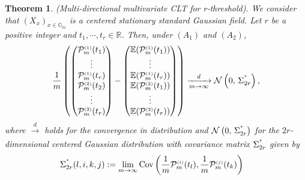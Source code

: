 \documentclass[12pt]{article}
\theoremstyle{Theorem}
\newtheorem{Theorem}{Theorem}[section]
\theoremstyle{definition}
\begin{document}
\begin{Theorem}\label{TCL}(Multi-directional multivariate CLT for r-threshold). We consider that $(X_{x})_{x\in \mathbb{G}_{m}}$ is a centered stationary standard Gaussian field. Let $r$ be a positive integer and $t_{1}, \cdots,t_{r} \in \mathbb{R}$. Then, under \textbf{$(A_{1})$} and \textbf{$(A_{2})$},
\begin{equation*}
\frac{1}{m}\left(\begin{pmatrix} \mathcal{P}^{\scriptscriptstyle (1)}_{m}(t_{1}) \\  \vdots \\ \mathcal{P}^{\scriptscriptstyle (1)}_{m}(t_{r}) \\ \mathcal{P}^{\scriptscriptstyle (2)}_{m}(t_{2}) \\  \vdots \\ \mathcal{P}^{\scriptscriptstyle (2)}_{m}(t_{r})  \end{pmatrix} - \begin{pmatrix} \mathbb{E}(\mathcal{P}^{\scriptscriptstyle (1)}_{m}(t_{1}))  \\ \vdots \\ \mathbb{E}(\mathcal{P}^{\scriptscriptstyle (1)}_{m}(t_{r}))\\\mathbb{E}(\mathcal{P}^{\scriptscriptstyle (2)}_{m}(t_{1})) \\ \vdots \\ \mathbb{E}(\mathcal{P}^{\scriptscriptstyle (2)}_{m}(t_{r})) \end{pmatrix}\right) \xrightarrow[m \to \infty]{d} \mathcal{N}\left(0,\,\Sigma_{2r}^{\textcolor{white}{}^{\star}}\right),
\end{equation*}
where $\xrightarrow[]{d}$ holds for the convergence in distribution and $\mathcal{N}\left(0,\,\Sigma_{2r}^{\textcolor{white}{}^{\star}}\right)$ for the $2r$-dimensional centered Gaussian distribution with covariance matrix $\Sigma_{2r}^{\textcolor{white}{}^{\star}}$ given by
\begin{align}
\label{CovTCL}
\Sigma^{\textcolor{white}{}^{\star}}_{2r}(l,i,k,j) & : = \lim_{m \to \infty}\text{Cov}\left(\frac{1}{m}\mathcal{P}^{\scriptscriptstyle (i)}_{m}(t_{l}),  \frac{1}{m}\mathcal{P}^{\scriptscriptstyle (j)}_{m}(t_{k}) \right)
\end{align}
\end{Theorem}
\end{document}
